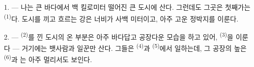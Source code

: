 %
%
%
%
%

\VUsaut{2.0mm}
\VUsaut{3.0mm}
\VUfilet{16mm}
\VUsaut{5.6mm}
\VUsaut{1.4mm}
\VUsaut{2.2mm}

\VUsaut{3.0mm}

1. --- 나는 큰 바다에서 백 킬로미터 떨어진 큰 도시에 산다. 그런데도 그곳은 첫째가는
 \textsuperscript{(1)}다. 도시를 끼고 흐르는 강은 너비가 사백 미터이고, 아주
고운 정박지를 이룬다.

2. ---  \textsuperscript{(2)}를 낀 도시의 온 부분은 아주 바다답고
공장다운 모습을 하고 있어,  \textsuperscript{(3)}을 이룬다 — 거기에는
뱃사람과 일꾼만 산다. 그들은  \textsuperscript{(4)}과 
\textsuperscript{(5)}에서 일하는데, 그 공장의 높은  \textsuperscript{(6)}과
는 아주 멀리서도 보인다.


